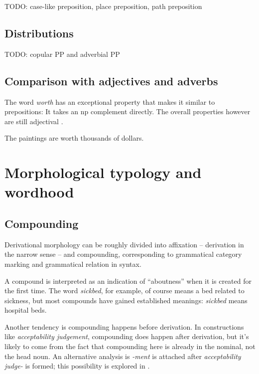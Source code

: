 \documentclass[UTF8, a4paper, oneside, scheme=plain, 12pt]{ctexbook}
\newcommand*{\citepage}[1]{p.~{#1}}
\newcommand{\form}[1]{\emph{#1}}
\begin{document}
TODO: case-like preposition, place preposition, path preposition \citet{spatialpp}

\subsection{Distributions}

TODO: copular PP and adverbial PP

\subsection{Comparison with adjectives and adverbs}

The word \form{worth} has an exceptional property
that makes it similar to prepositions:
It takes an \acs{np} complement directly.
The overall properties however are still adjectival \citep[\citepage{607}]{cgel}.

\begin{exe}
    \ex The paintings are worth thousands of dollars.
\end{exe}

\section{Morphological typology and wordhood}\label{sec:pos.morphology}


\subsection{Compounding}\label{sec:pos.overview.derivation.compound}

Derivational morphology can be roughly divided into 
affixation -- derivation in the narrow sense -- and compounding,
corresponding to grammatical category marking and grammatical relation in syntax.


A compound is interpreted as an indication of ``aboutness''
when it is created for the first time.
The word \form{sickbed}, 
for example, of course means a bed related to sickness,
but most compounds have gained established meanings:
\form{sickbed} means hospital beds.

Another tendency is compounding happens before derivation.
In constructions like \form{acceptability judgement},
compounding does happen after derivation,
but it's likely to come from the fact that 
compounding here is already in the nominal,
not the head noun.
An alternative analysis is \form{-ment} is attached after 
\form{acceptability judge-} is formed; 
this possibility is explored in .
\end{document}
